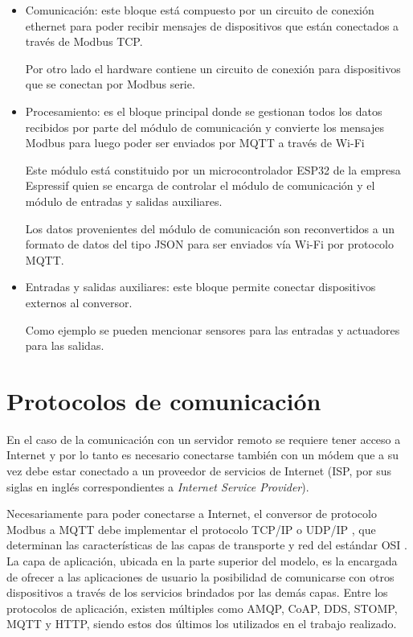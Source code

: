 \begin{itemize}
	\item Comunicación: este bloque está compuesto por un circuito de conexión ethernet para poder recibir mensajes de dispositivos que están conectados a través de Modbus TCP. 
	
	Por otro lado el hardware contiene un circuito de conexión para dispositivos que se conectan por Modbus serie.
	
	\item Procesamiento: es el bloque principal donde se gestionan todos los datos recibidos por parte del módulo de comunicación y  convierte los mensajes Modbus para luego poder ser enviados por MQTT a través de Wi-Fi  
	
	Este módulo está constituido por un microcontrolador ESP32 \citep{WEBSITE:11} de la empresa Espressif \citep{WEBSITE:10} quien se encarga de controlar el módulo de comunicación y el módulo de entradas y salidas auxiliares.
	
	Los datos provenientes del módulo de comunicación son reconvertidos a un formato de datos del tipo JSON \citep{WEBSITE:12} para ser enviados vía Wi-Fi por protocolo MQTT.
	
	
	\item Entradas y salidas auxiliares: este bloque permite conectar dispositivos externos al conversor. 
	
	Como ejemplo se pueden mencionar sensores para las entradas y actuadores para las salidas. 
	
	
\end{itemize}


\section{Protocolos de comunicación}
En el caso de la comunicación con un servidor remoto se requiere tener acceso a Internet y por lo tanto es necesario conectarse también con un módem que a
su vez debe estar conectado a un proveedor de servicios de Internet (ISP, por sus siglas en inglés correspondientes a \textit{Internet Service Provider}).

Necesariamente para poder conectarse a Internet, el conversor de protocolo Modbus a MQTT debe implementar el protocolo TCP/IP \citep{WEBSITE:15} o UDP/IP \citep{WEBSITE:16}, que determinan las características de las capas de transporte y red del estándar OSI \citep{WEBSITE:13}. La capa de aplicación, ubicada en la parte superior del modelo, es la encargada de ofrecer a las aplicaciones de usuario la posibilidad de comunicarse con otros dispositivos a través de los servicios brindados por las demás capas. Entre los protocolos de aplicación, existen múltiples como AMQP, CoAP, DDS, STOMP, MQTT y HTTP, siendo estos dos últimos los utilizados en el trabajo realizado.

